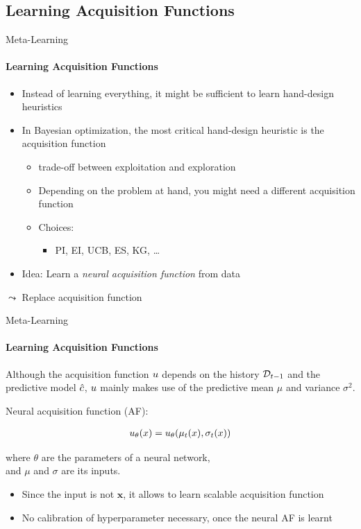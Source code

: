\subsection{Learning Acquisition Functions}
\begin{frame}[c]{Meta-Learning}
\framesubtitle{Learning Acquisition Functions}

\begin{itemize}
	\item Instead of learning everything, it might be sufficient to \alert{learn hand-design heuristics}
	\pause
	\item In Bayesian optimization, the most critical hand-design heuristic is the acquisition function
	\begin{itemize}
		\item trade-off between exploitation and exploration
		\item Depending on the problem at hand, you might need a different acquisition function
		\pause
		\item Choices:
		\begin{itemize}
			\item PI, EI, UCB, ES, KG, \dots
		\end{itemize} 
	\end{itemize}
	\pause
	\item \alert{Idea:} Learn a \emph{neural acquisition function} from data
\end{itemize}

$\leadsto$ Replace acquisition function 


\end{frame}
\begin{frame}[c]{Meta-Learning}
\framesubtitle{Learning Acquisition Functions}

Although the \alert{acquisition function $u$} depends on the history $\mathcal{D}_{t-1}$ and the predictive model $\hat{c}$, $u$ mainly makes use of the \alert{predictive mean $\mu$ and variance $\sigma^2$}.

\pause
\bigskip

Neural acquisition function (AF):

\begin{eqnarray}
u_\theta(x) = u_\theta(\mu_t(x), \sigma_t(x)) \nonumber
\end{eqnarray}

where $\theta$ are the parameters of a neural network,\\ and $\mu$ and $\sigma$ are its inputs.

\pause 
\begin{itemize}
	\item Since the input is not $\pmb{x}$, it allows to learn scalable acquisition function
	\item No calibration of hyperparameter necessary, once the neural AF is learnt
\end{itemize}

\end{frame}

